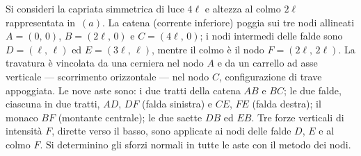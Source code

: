 \begin{esempio}\label{ese:capriata_palladiana}
	Si consideri la capriata simmetrica di luce $4\ell$
	e altezza al colmo $2\ell$ rappresentata in
	\,$(a)$. La catena
	(corrente inferiore) poggia sui tre nodi allineati
	$A = (0,\,0)$, $B = (2\ell,\,0)$ e $C = (4\ell,\,0)$;
	i nodi intermedi delle falde sono $D = (\ell,\,\ell)$
	ed $E = (3\ell,\,\ell)$, mentre il colmo è il nodo
	$F = (2\ell,\,2\ell)$. La travatura è vincolata da
	una cerniera nel nodo $A$ e da un carrello ad asse
	verticale --- scorrimento orizzontale --- nel
	nodo $C$, configurazione di trave appoggiata.
	Le nove aste sono: i due tratti della catena
	$AB$ e $BC$; le due falde, ciascuna in due tratti,
	$AD$, $DF$ (falda sinistra) e $CE$, $FE$ (falda
	destra); il monaco $BF$ (montante centrale);
	le due saette $DB$ ed $EB$.
	Tre forze verticali di intensità $F$, dirette verso
	il basso, sono applicate ai nodi delle falde $D$, $E$
	e al colmo $F$.
	Si determinino gli sforzi normali in tutte le aste
	con il metodo dei nodi.
	
	\begin{svolgimento}
		
		\begin{figure}[htbp]
			\centering
			\begin{minipage}[t]{0.48\textwidth}
				\centering
\end{minipage}
\end{figure}
\end{svolgimento}
\end{esempio}
